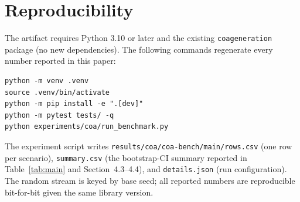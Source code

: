 \documentclass[sigconf]{acmart}
\begin{document}



\appendix

\section{Reproducibility}

The artifact requires Python 3.10 or later and the existing \texttt{coageneration} package (no new dependencies). The following commands regenerate every number reported in this paper:

\begin{verbatim}
python -m venv .venv
source .venv/bin/activate
python -m pip install -e ".[dev]"
python -m pytest tests/ -q
python experiments/coa/run_benchmark.py
\end{verbatim}

The experiment script writes \texttt{results/coa/coa-bench/main/rows.csv} (one row per scenario), \texttt{summary.csv} (the bootstrap-CI summary reported in Table~\ref{tab:main} and Section~4.3--4.4), and \texttt{details.json} (run configuration). The random stream is keyed by base seed; all reported numbers are reproducible bit-for-bit given the same library version.
\end{document}
